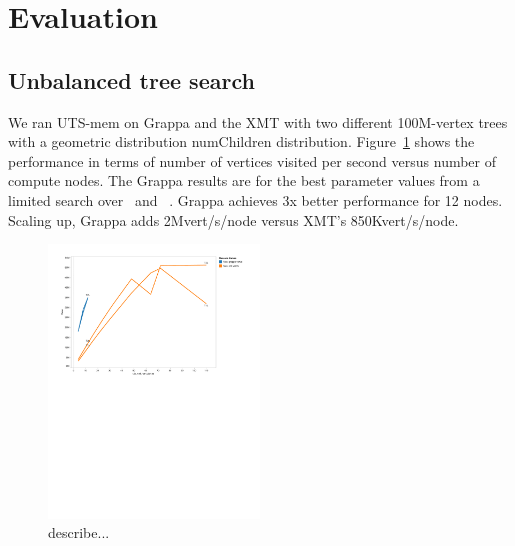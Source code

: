 \section{Evaluation} \label{sec:evaluation}

\subsection{Unbalanced tree search}

We ran UTS-mem on Grappa and the XMT with two different 100M-vertex trees with a geometric distribution numChildren distribution. Figure~\ref{fig:grappa-xmt-uts} shows the performance in terms of number of vertices visited per second versus number of compute nodes. The Grappa results are for the best parameter values from a limited search over \flushtimeout~and \asyncforthr~. Grappa achieves 3x better performance for 12 nodes. Scaling up, Grappa adds 2Mvert/s/node versus XMT's 850Kvert/s/node.






\begin{figure}[h]
    \begin{center}
        \includegraphics[width=0.5\textwidth]{figs/grappa-xmt-uts.pdf}
    \end{center}
    \caption{describe...}
    \label{fig:grappa-xmt-uts}
\end{figure}


